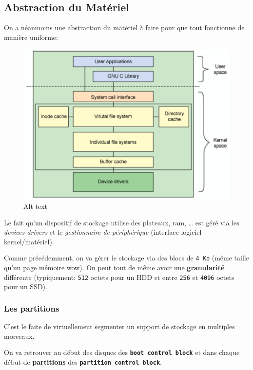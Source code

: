 \subsection{Abstraction du Matériel}\label{abstraction-du-matuxe9riel}

On a néanmoins une abstraction du matériel à faire pour que tout
fonctionne de manière uniforme:

\begin{figure}
\centering
\includegraphics{image-37.png}
\caption{Alt text}
\end{figure}

Le fait qu'un dispositif de stockage utilise des plateaux, ram, \ldots{}
est géré via les \emph{devices drivers} et le \emph{gestionnaire de
périphérique} (interface logiciel kernel/matériel).

Comme précédemment, on va gérer le stockage via des blocs de
\texttt{4\ Ko} (même taille qu'un page mémoire wow). On peut tout de
même avoir une \textbf{granularité} différente (typiquement:
\texttt{512} octets pour un HDD et entre \texttt{256} et \texttt{4096}
octets pour un SSD).

\subsubsection{Les partitions}\label{les-partitions}

C'est le faite de virtuellement segmenter un support de stockage en
multiples morceaux.

On va retrouver au début des disques des
\textbf{\texttt{boot\ control\ block}} et dans chaque début de
\textbf{partitions} des \textbf{\texttt{partition\ control\ block}}.


